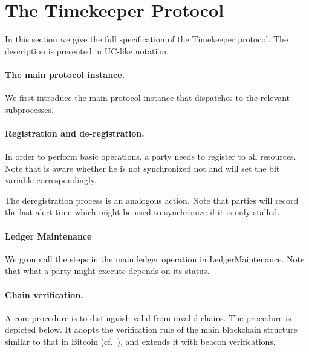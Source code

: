 \section{The \textsf{Timekeeper} Protocol}
\label{sec:complete-protocol-description}

In this section we give the full specification of the \textsf{Timekeeper} protocol.
%
The description is presented in UC-like notation.

\paragraph{The main protocol instance.}
%
We first introduce the main \timekeeper protocol instance that dispatches to the relevant subprocesses.



\paragraph{Registration and de-registration.}
%
In order to perform basic operations, a party \party needs to register to all resources.
%
Note that \party is aware whether he is not synchronized not and will set the bit variable \isSync correspondingly.



The deregistration process is an analogous action.
%
Note that parties will record the last alert time which might be used to synchronize if it is only stalled.



\paragraph{Ledger Maintenance}
%
We group all the steps in the main ledger operation in \textsf{LedgerMaintenance}.
%
Note that what a party might execute depends on its status.



\paragraph{Chain verification.}
%
A core procedure is to distinguish valid from invalid chains.
%
The procedure is depicted below.
%
It adopts the verification rule of the main blockchain structure similar to that in Bitcoin (cf.~\cite{C:GarKiaLeo17,EPRINT:GarKiaLeo20}), and extends it with beacon verifications.

